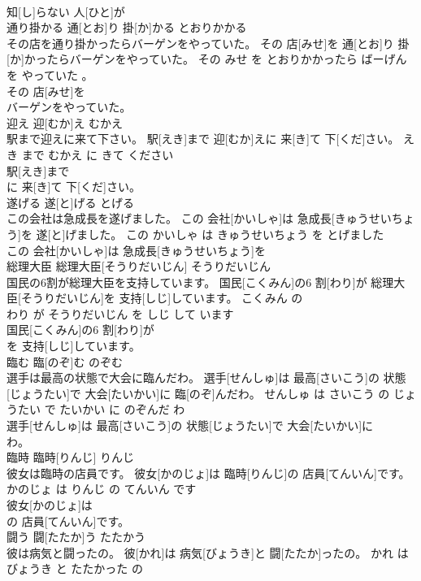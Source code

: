 \documentclass[8pt]{extreport}
\begin{document}
\begin{CJK}{UTF8}{min}
\\	知[し]らない 人[ひと]が
\\	通り掛かる	通[とお]り 掛[か]かる	とおりかかる	
\\	その店を通り掛かったらバーゲンをやっていた。	その 店[みせ]を 通[とお]り 掛[か]かったらバーゲンをやっていた。	その みせ を とおりかかったら ばーげん を やっていた 。	
\\	その 店[みせ]を
\\	バーゲンをやっていた。			
\\	迎え	迎[むか]え	むかえ	
\\	駅まで迎えに来て下さい。	駅[えき]まで 迎[むか]えに 来[き]て 下[くだ]さい。	えき まで むかえ に きて ください	
\\	駅[えき]まで
\\	に 来[き]て 下[くだ]さい。			
\\	遂げる	遂[と]げる	とげる	
\\	この会社は急成長を遂げました。	この 会社[かいしゃ]は 急成長[きゅうせいちょう]を 遂[と]げました。	この かいしゃ は きゅうせいちょう を とげました	
\\	この 会社[かいしゃ]は 急成長[きゅうせいちょう]を
\\	総理大臣	総理大臣[そうりだいじん]	そうりだいじん	
\\	国民の6割が総理大臣を支持しています。	国民[こくみん]の6 割[わり]が 総理大臣[そうりだいじん]を 支持[しじ]しています。	こくみん の 
\\	わり が そうりだいじん を しじ して います	
\\	国民[こくみん]の6 割[わり]が
\\	を 支持[しじ]しています。			
\\	臨む	臨[のぞ]む	のぞむ	
\\	選手は最高の状態で大会に臨んだわ。	選手[せんしゅ]は 最高[さいこう]の 状態[じょうたい]で 大会[たいかい]に 臨[のぞ]んだわ。	せんしゅ は さいこう の じょうたい で たいかい に のぞんだ わ	
\\	選手[せんしゅ]は 最高[さいこう]の 状態[じょうたい]で 大会[たいかい]に
\\	わ。			
\\	臨時	臨時[りんじ]	りんじ	
\\	彼女は臨時の店員です。	彼女[かのじょ]は 臨時[りんじ]の 店員[てんいん]です。	かのじょ は りんじ の てんいん です	
\\	彼女[かのじょ]は
\\	の 店員[てんいん]です。			
\\	闘う	闘[たたか]う	たたかう	
\\	彼は病気と闘ったの。	彼[かれ]は 病気[びょうき]と 闘[たたか]ったの。	かれ は びょうき と たたかった の	

\end{CJK}
\end{document}
